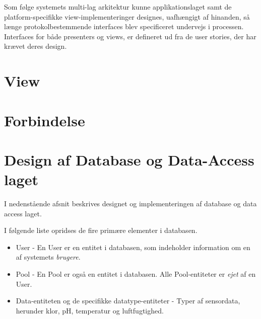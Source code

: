 Som følge systemets multi-lag arkitektur kunne applikationslaget samt de platform-specifikke view-implementeringer
designes, uafhængigt af hinanden, så længe protokolbestemmende interfaces blev specificeret undervejs i processen. Interfaces for både presenters og views, er defineret ud fra de user stories, der har krævet deres design.



\section{View}







\section{Forbindelse}



\section{Design af Database og Data-Access laget}\label{sec:designdatabase}
I nedenstående afsnit beskrives designet og implementeringen af database og data access laget.

I følgende liste opridses de fire primære elementer i databasen.

\begin{itemize}
	\item User - En User er en entitet i databasen, som indeholder information om en af systemets \textit{brugere}.
	\item Pool - En Pool er også en entitet i databasen. Alle Pool-entiteter er \textit{ejet} af en User.
	\item Data-entiteten og de specifikke datatype-entiteter - Typer af sensordata, herunder klor, pH, temperatur og luftfugtighed.
\end{itemize}


